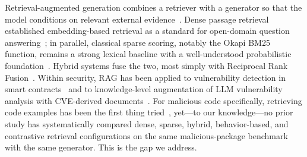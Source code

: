 Retrieval-augmented generation combines a retriever with a generator so that
the model conditions on relevant external evidence~\cite{lewis2020rag,
gao2023ragsurvey}. Dense passage retrieval established embedding-based
retrieval as a standard for open-domain question answering~\cite{dpr2020};
in parallel, classical sparse scoring, notably the Okapi BM25 function,
remains a strong lexical baseline with a well-understood probabilistic
foundation~\cite{bm252009}. Hybrid systems fuse the two, most simply with
Reciprocal Rank Fusion~\cite{rrf2009}. Within security, RAG has been applied
to vulnerability detection in smart contracts~\cite{yu2024smartcontract} and
to knowledge-level augmentation of LLM vulnerability analysis with
CVE-derived documents~\cite{du2024vulrag}. For malicious code specifically,
retrieving code examples has been the first thing
tried~\cite{ease2025rag, crag2024}, yet---to our knowledge---no prior study
has systematically compared dense, sparse, hybrid, behavior-based, and
contrastive retrieval configurations on the same malicious-package benchmark
with the same generator. This is the gap we address.
\endinput
